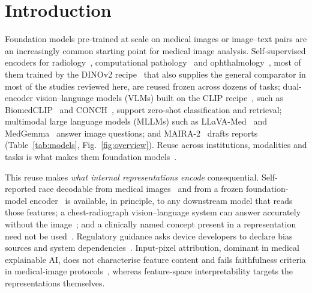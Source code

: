 \section{Introduction}
\label{sec:intro}

Foundation models pre-trained at scale on medical images or image--text pairs are an increasingly common
starting point for medical image analysis. Self-supervised encoders for
radiology~\cite{perezgarcia2024scalable}, computational pathology~\cite{chen2024generalpurpose,xu2024wholeslide,vorontsov2024model} and ophthalmology~\cite{zhou2023model}, most of them trained by the DINOv2 recipe~\cite{oquab2024dinov2} that also supplies the general comparator in most of the studies reviewed here, are reused frozen across dozens of tasks;
dual-encoder vision--language models (VLMs) built on the CLIP recipe~\cite{radford2021learning}, such as
BiomedCLIP~\cite{zhang2023biomedclip} and CONCH~\cite{lu2024visuallanguage}, support zero-shot
classification and retrieval; multimodal large
language models (MLLMs) such as LLaVA-Med~\cite{li2023llavamed} and MedGemma~\cite{sellergren2025medgemma}
answer image questions; and MAIRA-2~\cite{bannur2024maira2} drafts reports
(Table~\ref{tab:models}, Fig.~\ref{fig:overview}). Reuse
across institutions, modalities and tasks is what makes them foundation models~\cite{bommasani2021opportunities}.

This reuse makes \emph{what internal representations encode} consequential. Self-reported race decodable
from medical images~\cite{banerjee2021ai} and from a frozen foundation-model encoder~\cite{zheng2024demographic}
is available, in principle, to any downstream model that reads those features; a chest-radiograph vision--language system can answer accurately
without the image~\cite{lotfinia2026vision}; and a clinically named concept present in a
representation need not be used~\cite{basu2026interpretability}. Regulatory guidance asks device
developers to declare bias sources and system dependencies~\cite{fda2025aiguidance,euaiact2024}.
Input-pixel attribution, dominant in medical explainable AI, does not characterise feature content and fails
faithfulness criteria in medical-image protocols~\cite{arun2021trustworthiness,sadanandan2026attention},
whereas feature-space interpretability targets the representations themselves.

